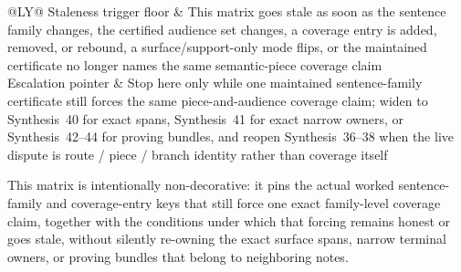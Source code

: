 \documentclass[11pt]{article}
\begin{document}
\begin{table}[t]
\begin{tabularx}{\linewidth}{@{}LY@{}}
Staleness trigger floor & This matrix goes stale as soon as the sentence family changes, the certified audience set changes, a coverage entry is added, removed, or rebound, a \textsf{surface}/\textsf{support-only} mode flips, or the maintained certificate no longer names the same semantic-piece coverage claim \\
Escalation pointer & Stop here only while one maintained sentence-family certificate still forces the same piece-and-audience coverage claim; widen to Synthesis~40 for exact spans, Synthesis~41 for exact narrow owners, or Synthesis~42--44 for proving bundles, and reopen Synthesis~36--38 when the live dispute is route / piece / branch identity rather than coverage itself \\
\bottomrule
\end{tabularx}
\caption{A forced public challenge-coverage matrix. This is the smallest family-level coverage object later terse papers can quote directly when the live issue is whether one maintained sentence family still forces the same piece-and-audience coverage claim rather than merely which sentence family exists in the abstract.}
\label{tab:forced-public-challenge-coverage-matrix}
\end{table}

This matrix is intentionally non-decorative: it pins the actual worked sentence-family and coverage-entry keys that still force one exact family-level coverage claim, together with the conditions under which that forcing remains honest or goes stale, without silently re-owning the exact surface spans, narrow terminal owners, or proving bundles that belong to neighboring notes.\cite{series:workedexample}
\end{document}
